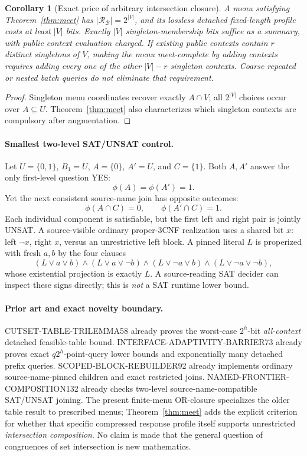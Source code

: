 \documentclass[11pt]{article}
\newtheorem{corollary}[theorem]{Corollary}
\begin{document}
\begin{corollary}[Exact price of arbitrary intersection closure]
A menu satisfying Theorem~\ref{thm:meet} has
\(\left|\mathcal R_{\mathcal B}\right|=2^{|V|}\), and its
lossless detached fixed-length profile costs \emph{at least}
\(|V|\) bits. Exactly \(|V|\) singleton-membership bits suffice
as a summary, with public context evaluation charged.
If existing public contexts contain \(r\) \emph{distinct}
singletons of \(V\), making the menu meet-complete by adding
contexts requires adding every one of the other
\(|V|-r\) singleton contexts. Coarse repeated or nested
batch queries do not eliminate that requirement.
\end{corollary}
\begin{proof}
Singleton menu coordinates recover exactly \(A\cap V\);
all \(2^{|V|}\) choices occur over \(A\subseteq U\).
Theorem~\ref{thm:meet} also characterizes which singleton
contexts are compulsory after augmentation.
\end{proof}

\paragraph{Smallest two-level SAT/UNSAT control.}
Let \(U=\{0,1\}\), \(B_1=U\),
\(A=\{0\}\), \(A'=U\), and \(C=\{1\}\).
Both \(A,A'\) answer the only first-level question YES:
\[
 \phi(A)=\phi(A')=1.
\]
Yet the next consistent source-name join has opposite outcomes:
\[
 \phi(A\cap C)=0,\qquad
 \phi(A'\cap C)=1.
\]
Each individual component is satisfiable, but the first left and
right pair is jointly UNSAT. A source-visible ordinary proper-3CNF
realization uses a shared bit \(x\): left \(\neg x\), right \(x\),
versus an unrestrictive left block. A pinned literal \(L\) is
properized with fresh \(a,b\) by the four clauses
\[
 (L\vee a\vee b)\wedge(L\vee a\vee\neg b)
 \wedge(L\vee\neg a\vee b)\wedge(L\vee\neg a\vee\neg b),
\]
whose existential projection is exactly \(L\).
A source-reading SAT decider can inspect these signs directly;
this is \emph{not} a SAT runtime lower bound.

\paragraph{Prior art and exact novelty boundary.}
CUTSET-TABLE-TRILEMMA58 already proves the worst-case
\(2^h\)-bit \emph{all-context} detached feasible-table bound.
INTERFACE-ADAPTIVITY-BARRIER73 already proves exact
\(q2^h\)-point-query lower bounds and exponentially many
detached prefix queries. SCOPED-BLOCK-REBUILDER92 already
implements ordinary source-name-pinned children and exact
restricted joins. NAMED-FRONTIER-COMPOSITION132 already checks
two-level source-name-compatible SAT/UNSAT joining.
The present finite-menu OR-closure specializes the older table
result to prescribed menus; Theorem~\ref{thm:meet} adds the
explicit criterion for whether that specific compressed response
profile itself supports unrestricted \emph{intersection composition}.
No claim is made that the general question of congruences of set
intersection is new mathematics.
\end{document}

